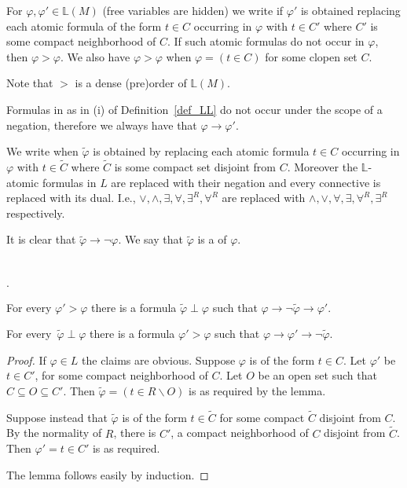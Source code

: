 \documentclass[11pt,oneside]{amsart}
\newcommand{\mylabel}[1]{{#1}\hfill}
\renewenvironment{itemize}
  {\begin{list}{$\cdot$}{%
  \setlength{\parskip}{0mm}
  \setlength{\topsep}{.2\baselineskip}
  \setlength{\rightmargin}{0mm}
  \setlength{\listparindent}{0mm}
  \setlength{\itemindent}{0mm}
  \setlength{\labelwidth}{3ex}
  \setlength{\itemsep}{.2\baselineskip}
  \setlength{\parsep}{.2\baselineskip}
  \setlength{\partopsep}{0mm}
  \setlength{\labelsep}{1ex}
  \setlength{\leftmargin}{\labelwidth+\labelsep}
  \let\makelabel\mylabel}}{%
\end{list}}
\renewcommand*{\emph}[1]{%
   \smash{\tikz[baseline]\node[rectangle, fill=teal!25, rounded corners, inner xsep=0.5ex, inner ysep=0.2ex, anchor=base, minimum height = 2.7ex]{#1};}}
\begin{document}
For $\varphi,\varphi'\in\mathds{L}(M)$ (free variables are hidden) we write \emph{$\varphi'>\varphi$\/} if $\varphi'$ is obtained replacing each atomic formula of the form $t\in C$ occurring in $\varphi$ with $t\in C'$ where $C'$ is some compact neighborhood of $C$.
If such atomic formulas do not occur in $\varphi$, then $\varphi>\varphi$.
We also have $\varphi>\varphi$ when $\varphi=(t\in C)$ for some clopen set $C$.

Note that $>$ is a dense (pre)order of $\mathds{L}(M)$.

Formulas in as in (i) of Definition~\ref{def_LL} do not occur under the scope of a negation, therefore we always have that $\varphi\to\varphi'$.

We write \emph{$\tilde{\varphi}\perp\varphi$\/} when $\tilde{\varphi}$ is obtained by replacing each atomic formula $t\in C$ occurring in $\varphi$ with $t\in\tilde{C}$ where $\tilde{C}$ is some compact set disjoint from $C$. 
Moreover the $\mathds{L}$-atomic formulas in $L$ are replaced with their negation and every connective is replaced with its dual.
I.e., $\vee, \wedge, \exists, \forall, \exists^R, \forall^R$ are replaced with $\wedge,\vee,\forall,\exists,\forall^R,\exists^R$ respectively.

It is clear that $\tilde{\varphi}\rightarrow\neg\varphi$.
We say that  $\tilde{\varphi}$ is a \emph{strong negation} of $\varphi$.

\begin{lemma}\label{lem_interpolation}\ 
  \begin{itemize}
    \item[1.]For every $\varphi'>\varphi$ there is a formula $\tilde{\varphi}\perp\varphi$ such that $\varphi\rightarrow\neg \tilde{\varphi}\rightarrow\varphi'$.
    \item[2.] For every\, $\tilde{\varphi}\perp\varphi$ there is a formula $\varphi'>\varphi$ such that  $\varphi\rightarrow\varphi'\rightarrow\neg \tilde{\varphi}$.
  \end{itemize}
\end{lemma}

\begin{proof}
  If $\varphi\in L$ the claims are obvious.
  Suppose $\varphi$ is of the form $t\in C$.
  Let $\varphi'$ be $t\in C'$, for some compact neighborhood of $C$.
  Let $O$ be an open set such that $C\subseteq O\subseteq C'$.
  Then $\tilde{\varphi}=(t\in R\smallsetminus O)$ is as required by the lemma.
  
  Suppose instead that $\tilde{\varphi}$ is of the form $t\in\tilde{C}$ for some compact $\tilde{C}$ disjoint from $C$.
  By the normality of $R$, there is  $C'$, a compact neighborhood of $C$ disjoint from $\tilde{C}$.
  Then  $\varphi'=t\in C'$ is as required.

  The lemma follows easily by induction.
\end{proof}
\end{document}
